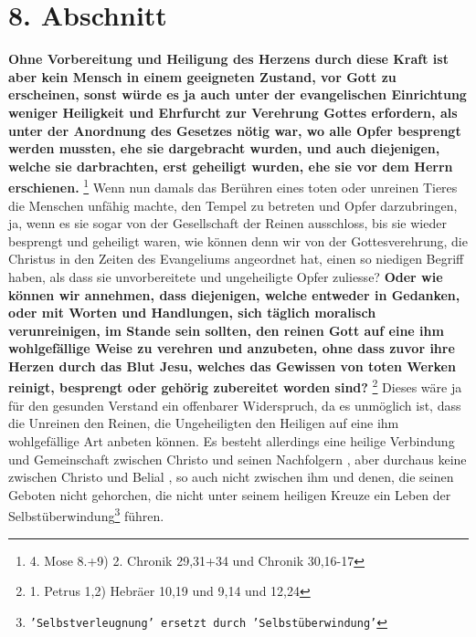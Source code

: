 \section{8. Abschnitt} \label{kap6_ab8}

\textbf{Ohne Vorbereitung und Heiligung des Herzens
durch diese Kraft ist aber kein
Mensch in einem geeigneten Zustand, vor Gott zu erscheinen, sonst würde es ja
auch unter der evangelischen Einrichtung weniger Heiligkeit und Ehrfurcht zur
Verehrung Gottes erfordern, als unter der Anordnung des Gesetzes nötig war, wo
alle Opfer besprengt werden mussten, ehe sie dargebracht wurden, und auch
diejenigen, welche sie darbrachten, erst geheiligt wurden, ehe sie vor dem
Herrn erschienen.}
\footnote{4. Mose 8.+9) 2. Chronik 29,31+34 und Chronik 30,16-17}
Wenn nun damals das Berühren eines toten oder unreinen Tieres die Menschen
unfähig machte, den Tempel zu betreten und Opfer darzubringen, ja, wenn es sie
sogar von der Gesellschaft der Reinen ausschloss, bis sie wieder besprengt und
geheiligt waren, wie können denn wir von der Gottesverehrung, die Christus in
den Zeiten des Evangeliums angeordnet hat, einen so niedigen Begriff haben, als
dass sie unvorbereitete und ungeheiligte Opfer zuliesse?
\label{ref:06_08_moralisch_verunreinigt} \textbf{Oder wie können wir
annehmen, dass diejenigen, welche entweder in Gedanken, oder mit Worten und
Handlungen, sich täglich moralisch verunreinigen, im Stande sein sollten, den
reinen Gott auf eine ihm wohlgefällige Weise zu verehren und anzubeten, ohne
dass zuvor ihre Herzen durch das Blut Jesu, welches das Gewissen von toten
Werken  reinigt, besprengt oder gehörig zubereitet worden
sind?}
\footnote{1. Petrus 1,2)  Hebräer 10,19 und 9,14 und 12,24}
Dieses wäre ja für den gesunden Verstand ein
offenbarer Widerspruch, da es unmöglich ist, dass die Unreinen den Reinen, die
Ungeheiligten den Heiligen   auf eine ihm
wohlgefällige Art anbeten können. Es
besteht allerdings eine heilige Verbindung und Gemeinschaft
zwischen Christo
und seinen Nachfolgern , aber durchaus keine
zwischen
Christo
und Belial , so
auch nicht zwischen ihm und denen, die seinen Geboten nicht gehorchen, die nicht
unter seinem heiligen Kreuze ein Leben der
Selbstüberwindung\footnote{\texttt{'Selbstverleugnung' ersetzt durch
'Selbstüberwindung'}} führen.

